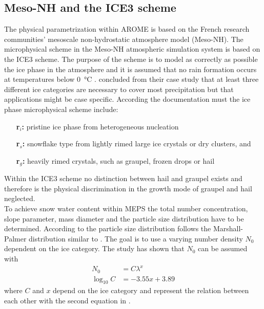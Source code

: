 \subsection{Meso-NH and the ICE3 scheme} \label{sec:MesoNH}
The physical parametrization within AROME is based on the French research communities' mesoscale non-hydrostatic atmosphere model (Meso-NH). The microphysical scheme in the Meso-NH atmospheric simulation system is based on the ICE3 scheme. The purpose of the scheme is to model as correctly as possible the ice phase in the atmosphere and it is assumed that no rain formation occurs at temperatures below \SI{0}{\celsius} \citep{pinty_mixed-phased_1998}. \cite{mccumber_comparison_1991} concluded from their case study that at least three different ice categories are necessary to cover most precipitation but that applications might be case specific. 
According the \cite{meteo_france_meso-nh_2009} documentation must the ice phase microphysical scheme include: 
\begin{itemize}
	\item [\textbf{r$_i$:}] pristine ice phase from heterogeneous nucleation 
	\item [\textbf{r$_s$:}] snowflake type from lightly rimed large ice crystals or dry clusters, and
	\item [\textbf{r$_g$:}] heavily rimed crystals, such as graupel, frozen drops or hail
\end{itemize}

Within the ICE3 scheme no distinction between hail and graupel exists and therefore is the physical discrimination in the growth mode of graupel and hail neglected. \\
To achieve snow water content within MEPS the total number concentration, slope parameter, mass diameter and  the particle size distribution have to be determined. 
According to \cite{caniaux_numerical_1994} the particle size distribution  follows the Marshall-Palmer distribution similar to . The goal is to use a varying number density $N_0$ dependent on the ice category. The study has shown that $N_0$ can be assumed with
\begin{align}
	N_0 & = C \lambda^x  \label{eq:N0}
	\\
	\log_{10}C & = -3.55x + 3.89  \nonumber
\end{align}
where $C$ and $x$ depend on the ice category and represent the relation between each other with the second equation in . 
